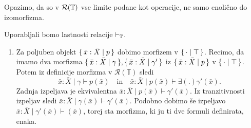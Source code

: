 \documentclass[../kategoricna_logika.tex]{subfiles}
\begin{document}
  \begin{opomba}
    Opazimo, da so v $\mathcal{R}(\mathbb{T})$ vse limite podane kot operacije, ne
    samo enolično do izomorfizma.
  \end{opomba}
  \begin{dokaz}
    Uporabljali bomo lastnosti relacije $\vdash_{\mathbb{T}}$.
    \begin{enumerate}[label=(\roman*)]
    \item Za poljuben objekt $\lbrace\,\bar{x}:\bar{X} \mid p\,\rbrace$ dobimo morfizem v
      $\lbrace\,\cdot \mid \top\,\rbrace$.  Recimo, da imamo dva morfizma
      $\lbrace\,\bar{x}:\bar{X} \mid \gamma\,\rbrace, \lbrace\,\bar{x}:\bar{X} \mid \gamma'\,\rbrace$ iz $\lbrace\,\bar{x}:\bar{X} \mid p\,\rbrace$
      v $\lbrace\,\cdot \mid \top\,\rbrace$.  Potem iz definicije morfizma v
      $\mathcal{R}(\mathbb{T})$ sledi
      \[\bar{x}:\bar{X} \mid \gamma \vdash p(\bar{x})\quad \text{in}\quad \bar{x}:\bar{X} \mid
        p(\bar{x}) \vdash \exists (.) \gamma'(\bar{x}).\] Zadnja
      izpeljava je ekvivalentna
      $\bar{x}:\bar{X} \mid p(\bar{x}) \vdash \gamma'(\bar{x})$.  Iz tranzitivnosti
      izpeljav sledi $\bar{x}:\bar{X} \mid \gamma(\bar{x}) \vdash \gamma'(\bar{x})$.
      Podobno dobimo še izpeljavo $\bar{x}:\bar{X} \mid \gamma'(\bar{x}) \vdash(\bar{x}) $, torej
      sta morfizma, ki ju ti dve formuli definirata, enaka.
    

\end{enumerate}
\end{dokaz}
\end{document}
